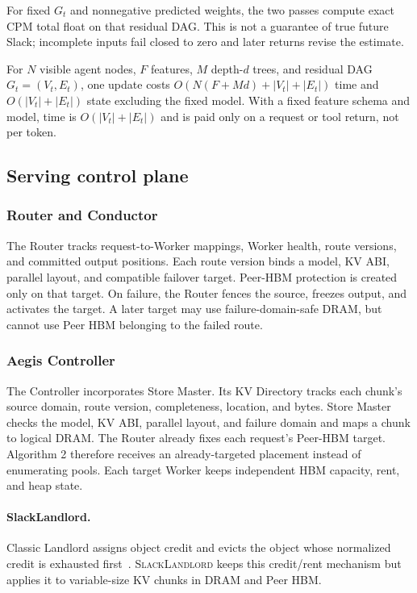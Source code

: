 For fixed $G_t$ and nonnegative predicted weights, the two passes compute exact
CPM total float on that residual DAG.  This is not a guarantee of true future
Slack; incomplete inputs fail closed to zero and later returns revise the estimate.

For $N$ visible agent nodes, $F$ features, $M$ depth-$d$ trees, and residual
DAG $G_t=(V_t,E_t)$, one update costs
$O(N(F+Md)+|V_t|+|E_t|)$ time and $O(|V_t|+|E_t|)$ state excluding the fixed
model.  With a fixed feature schema and model, time is
$O(|V_t|+|E_t|)$ and is paid only on a request or tool return, not per token.



\subsection{Serving control plane}
\label{sec:control-plane}

\subsubsection{Router and Conductor}

The Router tracks request-to-Worker mappings, Worker health, route versions,
and committed output positions.  Each route version binds a model, KV ABI,
parallel layout, and compatible failover target.  Peer-HBM protection is
created only on that target.  On failure, the Router fences the source, freezes
output, and activates the target.  A later target may use failure-domain-safe
DRAM, but cannot use Peer HBM belonging to the failed route.

\subsubsection{Aegis Controller}

The Controller incorporates Store Master.  Its KV Directory tracks each
chunk's source domain, route version, completeness, location, and bytes.
Store Master checks the model, KV ABI, parallel layout, and failure domain and
maps a chunk to logical DRAM.  The Router already fixes each request's
Peer-HBM target.  Algorithm 2 therefore receives an already-targeted placement
instead of enumerating pools.  Each target Worker keeps independent HBM
capacity, rent, and heap state.

\paragraph{SlackLandlord.}
Classic Landlord assigns object credit and evicts the object whose normalized
credit is exhausted first~\cite{young2002online}.  \textsc{SlackLandlord} keeps
this credit/rent mechanism but applies it to variable-size KV chunks in DRAM
and Peer HBM.

